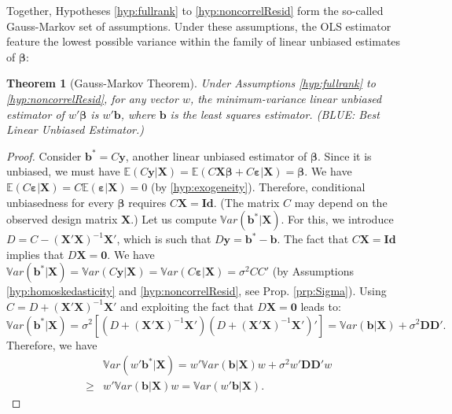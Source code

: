\documentclass[
  11pt,
]{book}
\newtheorem{theorem}{Theorem}[chapter]
\theoremstyle{definition}
\theoremstyle{definition}
\theoremstyle{definition}
\theoremstyle{definition}
\theoremstyle{remark}
\begin{document}
Together, Hypotheses \ref{hyp:fullrank} to \ref{hyp:noncorrelResid} form the so-called Gauss-Markov set of assumptions. Under these assumptions, the OLS estimator feature the lowest possible variance within the family of linear unbiased estimates of \(\boldsymbol\beta\):

\begin{theorem}[Gauss-Markov Theorem]
\protect\hypertarget{thm:GaussMarkov}{}\label{thm:GaussMarkov}Under Assumptions \ref{hyp:fullrank} to \ref{hyp:noncorrelResid}, for any vector \(w\), the minimum-variance linear unbiased estimator of \(w' \boldsymbol\beta\) is \(w' \mathbf{b}\), where \(\mathbf{b}\) is the least squares estimator. (BLUE: Best Linear Unbiased Estimator.)
\end{theorem}

\begin{proof}
Consider \(\mathbf{b}^* = C \mathbf{y}\), another linear unbiased estimator of \(\boldsymbol\beta\). Since it is unbiased, we must have \(\mathbb{E}(C\mathbf{y}|\mathbf{X}) = \mathbb{E}(C\mathbf{X}\boldsymbol\beta + C\boldsymbol\varepsilon|\mathbf{X}) = \boldsymbol\beta\). We have \(\mathbb{E}(C\boldsymbol\varepsilon|\mathbf{X})=C\mathbb{E}(\boldsymbol\varepsilon|\mathbf{X})=0\) (by \ref{hyp:exogeneity}). Therefore, conditional unbiasedness for every \(\boldsymbol\beta\) requires \(C\mathbf{X}=\mathbf{Id}\). (The matrix \(C\) may depend on the observed design matrix \(\mathbf{X}\).) Let us compute \(\mathbb{V}ar(\mathbf{b^*}|\mathbf{X})\). For this, we introduce \(D = C - (\mathbf{X}'\mathbf{X})^{-1}\mathbf{X}'\), which is such that \(D\mathbf{y}=\mathbf{b}^*-\mathbf{b}\). The fact that \(C\mathbf{X}=\mathbf{Id}\) implies that \(D\mathbf{X} = \mathbf{0}\). We have \(\mathbb{V}ar(\mathbf{b^*}|\mathbf{X}) = \mathbb{V}ar(C \mathbf{y}|\mathbf{X}) =\mathbb{V}ar(C \boldsymbol\varepsilon|\mathbf{X}) = \sigma^2CC'\) (by Assumptions \ref{hyp:homoskedasticity} and \ref{hyp:noncorrelResid}, see Prop. \ref{prp:Sigma}). Using \(C=D+(\mathbf{X}'\mathbf{X})^{-1}\mathbf{X}'\) and exploiting the fact that \(D\mathbf{X} = \mathbf{0}\) leads to:
\[
\mathbb{V}ar(\mathbf{b^*}|\mathbf{X}) =\sigma^2\left[(D+(\mathbf{X}'\mathbf{X})^{-1}\mathbf{X}')(D+(\mathbf{X}'\mathbf{X})^{-1}\mathbf{X}')'\right] = \mathbb{V}ar(\mathbf{b}|\mathbf{X}) + \sigma^2 \mathbf{D}\mathbf{D}'.
\]
Therefore, we have
\begin{eqnarray*}
&&\mathbb{V}ar(w'\mathbf{b^*}|\mathbf{X})=w'\mathbb{V}ar(\mathbf{b}|\mathbf{X})w + \sigma^2 w'\mathbf{D}\mathbf{D}'w\\
&\ge& w'\mathbb{V}ar(\mathbf{b}|\mathbf{X})w=\mathbb{V}ar(w'\mathbf{b}|\mathbf{X}).
\end{eqnarray*}
\end{proof}
\end{document}
